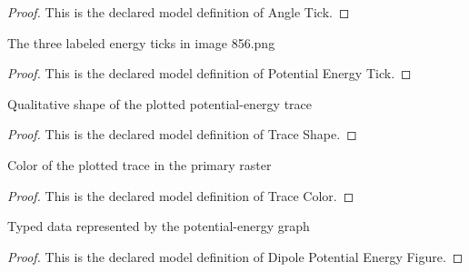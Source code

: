 \begin{proof}
  This is the declared model definition of Angle Tick.
\end{proof}
\begin{definition}
  \label{def:physics:phyx-mini-0856:phyxminiproblems-problemphyxmini0856-potentialenergytick}
  The three labeled energy ticks in image 856.png
\end{definition}
\begin{proof}
  This is the declared model definition of Potential Energy Tick.
\end{proof}
\begin{definition}
  \label{def:physics:phyx-mini-0856:phyxminiproblems-problemphyxmini0856-traceshape}
  Qualitative shape of the plotted potential-energy trace
\end{definition}
\begin{proof}
  This is the declared model definition of Trace Shape.
\end{proof}
\begin{definition}
  \label{def:physics:phyx-mini-0856:phyxminiproblems-problemphyxmini0856-tracecolor}
  Color of the plotted trace in the primary raster
\end{definition}
\begin{proof}
  This is the declared model definition of Trace Color.
\end{proof}
\begin{definition}
  \label{def:physics:phyx-mini-0856:phyxminiproblems-problemphyxmini0856-dipolepotentialenergyfigure}
  Typed data represented by the potential-energy graph
\end{definition}
\begin{proof}
  This is the declared model definition of Dipole Potential Energy Figure.
\end{proof}
